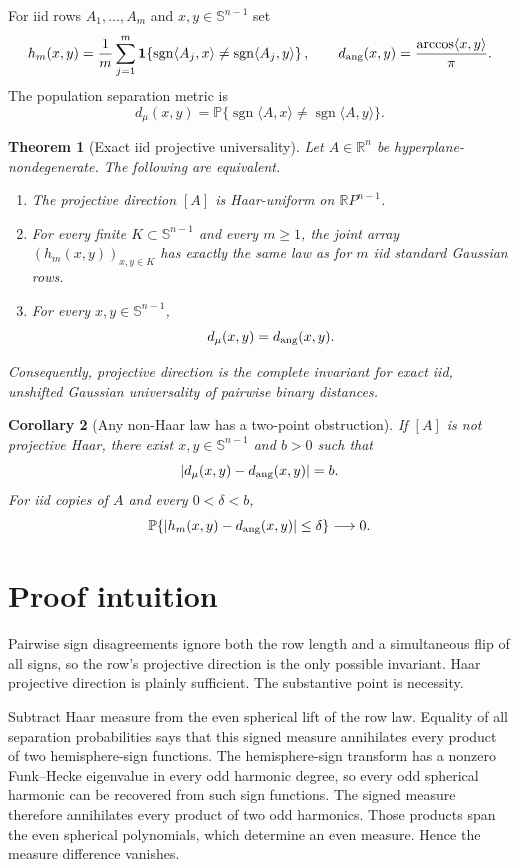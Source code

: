 \documentclass[11pt]{article}
\newtheorem{theorem}{Theorem}[section]
\newtheorem{corollary}[theorem]{Corollary}
\newcommand{\Sph}{\mathbb S}
\newcommand{\R}{\mathbb R}
\newcommand{\Pp}{\mathbb P}
\newcommand{\sgn}{\operatorname{sgn}}
\begin{document}
For iid rows $A_1,\dots,A_m$ and $x,y\in\Sph^{n-1}$ set
\[
  h_m(x,y)=\frac1m\sum_{j=1}^m
  \mathbf1\!\left\{
  \sgn\langle A_j,x\rangle\neq\sgn\langle A_j,y\rangle
  \right\},
  \qquad
  d_{\rm ang}(x,y)=\frac{\arccos\langle x,y\rangle}{\pi}.
\]
The population separation metric is
\[
  d_\mu(x,y)=\Pp\{\sgn\langle A,x\rangle
                     \neq\sgn\langle A,y\rangle\}.
\]

\begin{theorem}[Exact iid projective universality]\label{thm:main}
Let $A\in\R^n$ be hyperplane-nondegenerate.  The following are equivalent.
\begin{enumerate}
\item The projective direction $[A]$ is Haar-uniform on $\R P^{n-1}$.
\item For every finite $K\subset\Sph^{n-1}$ and every $m\geq1$, the joint
array $(h_m(x,y))_{x,y\in K}$ has exactly the same law as for $m$ iid standard
Gaussian rows.
\item For every $x,y\in\Sph^{n-1}$,
\[
  d_\mu(x,y)=d_{\rm ang}(x,y).
\]
\end{enumerate}
Consequently, projective direction is the complete invariant for exact iid,
unshifted Gaussian universality of pairwise binary distances.
\end{theorem}

\begin{corollary}[Any non-Haar law has a two-point obstruction]
If $[A]$ is not projective Haar, there exist $x,y\in\Sph^{n-1}$ and $b>0$
such that
\[
 |d_\mu(x,y)-d_{\rm ang}(x,y)|=b.
\]
For iid copies of $A$ and every $0<\delta<b$,
\[
 \Pp\{|h_m(x,y)-d_{\rm ang}(x,y)|\leq\delta\}\longrightarrow0.
\]
\end{corollary}

\section{Proof intuition}

Pairwise sign disagreements ignore both the row length and a simultaneous
flip of all signs, so the row's projective direction is the only possible
invariant.  Haar projective direction is plainly sufficient.  The substantive
point is necessity.

Subtract Haar measure from the even spherical lift of the row law.  Equality
of all separation probabilities says that this signed measure annihilates
every product of two hemisphere-sign functions.  The hemisphere-sign
transform has a nonzero Funk--Hecke eigenvalue in every odd harmonic degree,
so every odd spherical harmonic can be recovered from such sign functions.
The signed measure therefore annihilates every product of two odd harmonics.
Those products span the even spherical polynomials, which determine an even
measure.  Hence the measure difference vanishes.
\end{document}
